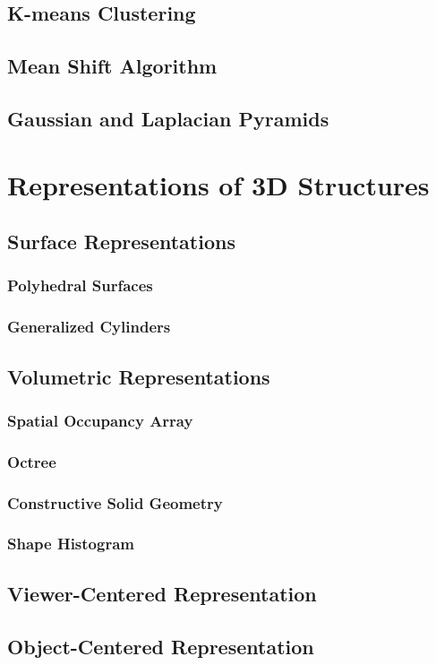 \documentclass{article}
\begin{document}
\begin{multicols}{2}
\subsection{K-means Clustering}
\subsection{Mean Shift Algorithm}
\subsection{Gaussian and Laplacian Pyramids}

\section{Representations of 3D Structures}
\subsection{Surface Representations}
\subsubsection{Polyhedral Surfaces}
\subsubsection{Generalized Cylinders}
\subsection{Volumetric Representations}
\subsubsection{Spatial Occupancy Array}
\subsubsection{Octree}
\subsubsection{Constructive Solid Geometry}
\subsubsection{Shape Histogram}
\subsection{Viewer-Centered Representation}
\subsection{Object-Centered Representation}

\end{multicols}
\end{document}
